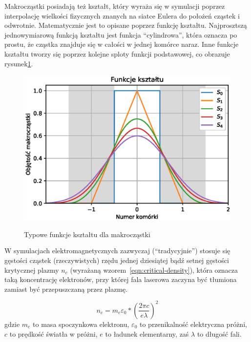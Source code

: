     Makrocząstki posiadają też kształt, który wyraża się w symulacji poprzez
    interpolację wielkości fizycznych znanych na siatce Eulera do położeń
    cząstek i odwrotnie. Matematycznie jest to opisane poprzez funkcję kształtu.
    Najprosztszą jednowymiarową funkcją kształtu jest funkcja ``cylindrowa'', która oznacza po
    prostu, że cząstka znajduje się w całości w jednej komórce naraz. %
    Inne funkcje kształtu tworzy się poprzez kolejne sploty funkcji podstawowej,
    co obrazuje rysunek\ref{fig:shapefunctions}.

    \begin{figure}[h!]
      \includegraphics{Images/shapefunctions}
      \label{fig:shapefunctions}
      \caption{Typowe funkcje kształtu dla makrocząstki}
    \end{figure}

    W symulacjach elektromagnetycznych zazwyczaj (``tradycyjnie'') stosuje się
    gęstości cząstek (rzeczywistych) rzędu jednej dziesiątej bądź setnej
    gęstości krytycznej plazmy $n_c$ (wyrażaną wzorem~\ref{eqn:critical-density}),
    która oznacza taką koncentrację
    elektronów, przy której fala laserowa zaczyna być tłumiona zamiast być
    przepuszczaną przez plazmę.\cite{chen}

    \begin{equation}
        n_c = m_e \varepsilon_0 * {(\frac{2 \pi c}{e \lambda})}^2
        \label{eqn:critical-density}
    \end{equation}
    gdzie $m_e$ to masa spoczynkowa elektronu, $\varepsilon_0$ to przenikalność
    elektryczna próżni, $c$ to prędkość światła w
    próżni, $e$ to ładunek elementarny, zaś $\lambda$ to długość fali.

